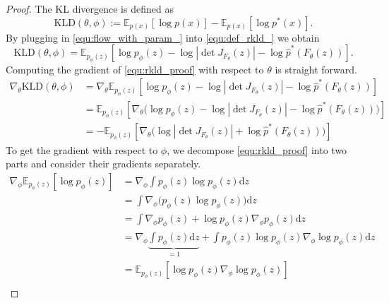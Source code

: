 \documentclass[twoside]{article}
\newcommand{\D}{\mathrm{d}}
\newcommand{\KLD}{\mathrm{KLD}}
\newcommand{\E}{\mathds{E}}
\begin{document}
\begin{proof}
    The KL divergence is defined as
    \begin{equation}
        \KLD(\theta, \phi) := \mathds{E}_{p(x)}\left[ \log p(x) \right] - \mathds{E}_{p(x)}\left[ \log p^*(x) \right] .
        \label{equ:def_rkld_}
    \end{equation}
	By plugging in \eqref{equ:flow_with_param_} into \eqref{equ:def_rkld_} we obtain
	\begin{equation}
		\KLD(\theta, \phi) = \E_{p_\phi(z)}\left[ \log p_\phi(z) - \log\left| \det J_{F_\theta}(z)\right|  - \log \hat{p}^*(F_\theta(z)) \right] .
		\label{equ:rkld_proof}
	\end{equation}
	Computing the gradient of \eqref{equ:rkld_proof} with respect to $\theta$ is straight forward.
	\begin{equation}
	\begin{split}
		\nabla_\theta \KLD(\theta, \phi) & = \nabla_\theta\E_{p_\phi(z)}\left[ \log p_\phi(z) - \log\left| \det J_{F_\theta}(z)\right|  - \log \hat{p}^*(F_\theta(z)) \right] \\ 
		& = \E_{p_\phi(z)}\left[ \nabla_\theta\big( \log p_\phi(z) - \log\left| \det J_{F_\theta}(z)\right|  - \log \hat{p}^*(F_\theta(z)) \big)\right] \\
		& = - \E_{p_\phi(z)}\left[ \nabla_\theta\big(\log\left| \det J_{F_\theta}(z)\right|  + \log \hat{p}^*(F_\theta(z)) \big)\right]
	\end{split}
	\end{equation}
	To get the gradient with respect to $\phi$, we decompose \eqref{equ:rkld_proof} into two parts and consider their gradients separately.
	\newpage
	\begin{equation}
	\begin{split}
		\nabla_\phi \E_{p_\phi(z)}\left[ \log p_\phi(z) \right] & = \nabla_\phi \int  p_\phi(z)\log p_\phi(z) \D z \\
		& = \int \nabla_\phi \big( p_\phi(z)\log p_\phi(z) \big) \D z \\ 
		& = \int \nabla_\phi p_\phi(z) + \log p_\phi(z) \nabla_\phi p_\phi(z) \D z \\ 
		& = \nabla_\phi \underbrace{\int p_\phi(z) \D z}_{=1} + \int p_\phi(z)\log p_\phi(z) \nabla_\phi \log p_\phi(z) \D z \\ 
		& = \E_{p_\phi(z)}\left[ \log p_\phi(z) \nabla_\phi \log p_\phi(z) \right] \\ 
	\end{split}
	\end{equation}

\end{proof}
\end{document}

